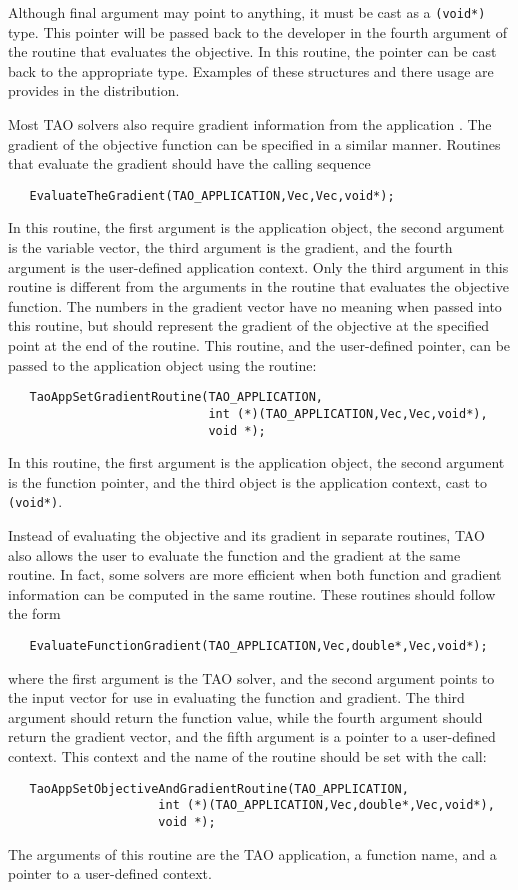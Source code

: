 Although final argument may point to anything, it must be cast as a {\tt (void*)} type.
This pointer will be passed back to the developer in the fourth argument of the
routine that evaluates the objective.  In this routine, the pointer can be cast
back to the appropriate type.  Examples of these structures and there usage
are provides in the distribution.


   Most TAO solvers also require gradient information from the 
application .
  The gradient of the objective function can be specified in a similar manner.
Routines that evaluate the gradient should have the calling sequence
\begin{verbatim}
   EvaluateTheGradient(TAO_APPLICATION,Vec,Vec,void*);
\end{verbatim}
\noindent
In this routine, the first
argument is the application object, the second argument is the variable
vector, the third argument is the gradient, and the fourth argument is
the user-defined application context.  Only the third argument in this
routine is different from the arguments in the routine that evaluates
the objective function.  The numbers in the gradient vector have no
meaning when passed into this routine, but should represent the gradient
of the objective at the specified point at the end of the routine.
This routine, and the user-defined pointer, can be passed to the application
object using the routine: 
\begin{verbatim}
   TaoAppSetGradientRoutine(TAO_APPLICATION,
                            int (*)(TAO_APPLICATION,Vec,Vec,void*),
                            void *);
\end{verbatim}
\noindent
In this routine, the first argument is the application object, the second argument
is the function pointer, and the third object is the application context, cast
to {\tt (void*)}.

   Instead of evaluating the objective and its gradient in separate
routines, TAO also allows the user to evaluate the function and the gradient
at the same routine.  In fact, some solvers are more efficient when
both function and gradient information can be computed in the same routine.
These routines should follow the form
\begin{verbatim}
   EvaluateFunctionGradient(TAO_APPLICATION,Vec,double*,Vec,void*);
\end{verbatim}
\noindent
where the first
argument is the TAO solver, and the second
argument points to the input vector for use in evaluating the
function and gradient. The third argument should return the
function value, while the fourth argument should return the gradient vector,
and the fifth argument is a pointer to a user-defined context.
This context and the name of the routine should be set with the
call: 
\begin{verbatim}
   TaoAppSetObjectiveAndGradientRoutine(TAO_APPLICATION,
                     int (*)(TAO_APPLICATION,Vec,double*,Vec,void*),
                     void *);
\end{verbatim}
\noindent
The arguments of this routine are the TAO application, a
function name, and a pointer to a user-defined context.

